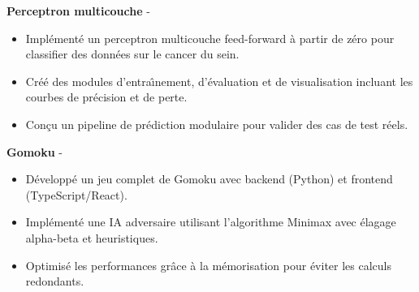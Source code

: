 \documentclass[a4paper,11pt]{article}%
\begin{document}
%
\noindent \textbf{Perceptron multicouche} - \href{https://github.com/sboof911/Multilayer-Perceptron}{{}}%
\begin{itemize}[leftmargin=2em,label={},parsep=0pt,topsep=1em]%
\item Impl\'ement\'e un perceptron multicouche feed-forward \`a partir de z\'ero pour classifier des donn\'ees sur le cancer du sein.%
\item Cr\'e\'e des modules d'entra{\^\i}nement, d'\'evaluation et de visualisation incluant les courbes de pr\'ecision et de perte.%
\item Con\c{c}u un pipeline de pr\'ediction modulaire pour valider des cas de test r\'eels.%
\end{itemize}%
%
\noindent \textbf{Gomoku} - \href{https://github.com/sboof911/Gomoku}{{}}%
\begin{itemize}[leftmargin=2em,label={},parsep=0pt,topsep=1em]%
\item D\'evelopp\'e un jeu complet de Gomoku avec backend (Python) et frontend (TypeScript/React).%
\item Impl\'ement\'e une IA adversaire utilisant l'algorithme Minimax avec \'elagage alpha-beta et heuristiques.%
\item Optimis\'e les performances gr\^ace \`a la m\'emorisation pour \'eviter les calculs redondants.%
\end{itemize}%
\end{document}
